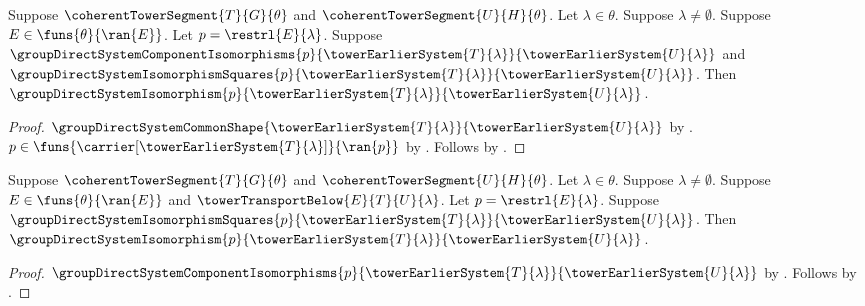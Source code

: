 \begin{proposition}\label{tower_transport_restriction_isomorphism_from_component_and_squares}
    Suppose $\coherentTowerSegment{T}{G}{\theta}$ and
        $\coherentTowerSegment{U}{H}{\theta}$.
    Let $\lambda\in\theta$.
    Suppose $\lambda\neq\emptyset$.
    Suppose $E\in\funs{\theta}{\ran{E}}$.
    Let $p=\restrl{E}{\lambda}$.
    Suppose $\groupDirectSystemComponentIsomorphisms{p}
        {\towerEarlierSystem{T}{\lambda}}
        {\towerEarlierSystem{U}{\lambda}}$ and
        $\groupDirectSystemIsomorphismSquares{p}
            {\towerEarlierSystem{T}{\lambda}}
            {\towerEarlierSystem{U}{\lambda}}$.
    Then $\groupDirectSystemIsomorphism{p}
        {\towerEarlierSystem{T}{\lambda}}
        {\towerEarlierSystem{U}{\lambda}}$.
\end{proposition}
\begin{proof}
    $\groupDirectSystemCommonShape
        {\towerEarlierSystem{T}{\lambda}}
        {\towerEarlierSystem{U}{\lambda}}$ by
        .
    $p\in\funs{\carrier[\towerEarlierSystem{T}{\lambda}]}{\ran{p}}$ by
        .
    Follows by .
\end{proof}

\begin{proposition}\label{tower_transport_restriction_isomorphism_from_squares}
    Suppose $\coherentTowerSegment{T}{G}{\theta}$ and
        $\coherentTowerSegment{U}{H}{\theta}$.
    Let $\lambda\in\theta$.
    Suppose $\lambda\neq\emptyset$.
    Suppose $E\in\funs{\theta}{\ran{E}}$ and
        $\towerTransportBelow{E}{T}{U}{\lambda}$.
    Let $p=\restrl{E}{\lambda}$.
    Suppose $\groupDirectSystemIsomorphismSquares{p}
        {\towerEarlierSystem{T}{\lambda}}
        {\towerEarlierSystem{U}{\lambda}}$.
    Then $\groupDirectSystemIsomorphism{p}
        {\towerEarlierSystem{T}{\lambda}}
        {\towerEarlierSystem{U}{\lambda}}$.
\end{proposition}
\begin{proof}
    $\groupDirectSystemComponentIsomorphisms{p}
        {\towerEarlierSystem{T}{\lambda}}
        {\towerEarlierSystem{U}{\lambda}}$ by
        .
    Follows by
        .
\end{proof}

